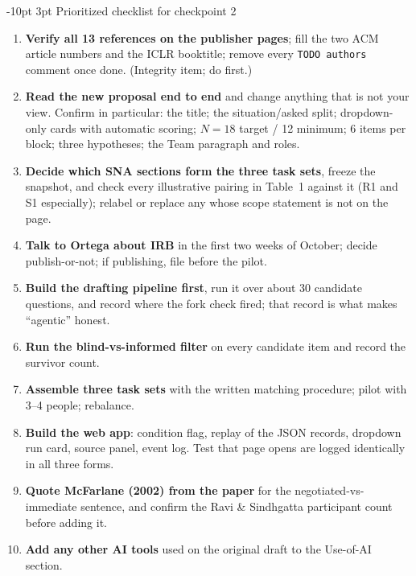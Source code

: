 \documentclass[9pt,letterpaper]{extarticle}
\makeatletter
\renewcommand\section{\@startsection{section}{1}{\z@}%
  {-10pt \@plus -2pt \@minus -1pt}{3pt}%
  {\sffamily\bfseries\large\color{accent}}}
\newcommand{\hd}[1]{\textbf{#1}}
\let\oldsection\section
\renewcommand{\section}{\needspace{7\baselineskip}\oldsection}
\makeatother
\begin{document}
\section{Prioritized checklist for checkpoint 2}
\begin{enumerate}[leftmargin=1.6em, itemsep=2pt, label=\sffamily\bfseries\color{accent}\arabic*.]
  \item \hd{Verify all 13 references on the publisher pages}; fill the two
  ACM article numbers and the ICLR booktitle; remove every
  \texttt{TODO authors} comment once done. (Integrity item; do first.)
  \item \hd{Read the new proposal end to end} and change anything that is not
  your view. Confirm in particular: the title; the situation/asked split;
  dropdown-only cards with automatic scoring; $N{=}18$ target / 12 minimum;
  6 items per block; three hypotheses; the Team paragraph and roles.
  \item \hd{Decide which SNA sections form the three task sets}, freeze the
  snapshot, and check every illustrative pairing in Table~1 against it (R1
  and S1 especially); relabel or replace any whose scope statement is not
  on the page.
  \item \hd{Talk to Ortega about IRB} in the first two weeks of October;
  decide publish-or-not; if publishing, file before the pilot.
  \item \hd{Build the drafting pipeline first}, run it over about 30
  candidate questions, and record where the fork check fired; that record
  is what makes ``agentic'' honest.
  \item \hd{Run the blind-vs-informed filter} on every candidate item and
  record the survivor count.
  \item \hd{Assemble three task sets} with the written matching procedure;
  pilot with 3--4 people; rebalance.
  \item \hd{Build the web app}: condition flag, replay of the JSON records,
  dropdown run card, source panel, event log. Test that page opens are logged
  identically in all three forms.
  \item \hd{Quote McFarlane (2002) from the paper} for the
  negotiated-vs-immediate sentence, and confirm the Ravi \& Sindhgatta
  participant count before adding it.
  \item \hd{Add any other AI tools} used on the original draft to the Use-of-AI
  section.
\end{enumerate}
\end{document}
